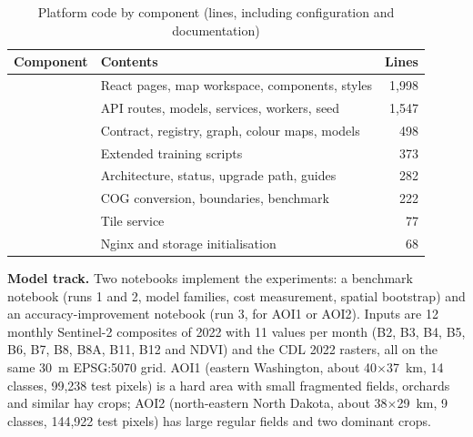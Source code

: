 \begin{table}[htbp]
\centering\small
\caption{Platform code by component (lines, including configuration and documentation)}
\label{tab:loc}
\begin{tabular}{L{4.0cm} L{6.6cm} r}
\toprule
\textbf{Component} & \textbf{Contents} & \textbf{Lines}\\
\midrule
{} & React pages, map workspace, components, styles & 1,998\\
 & API routes, models, services, workers, seed & 1,547\\
 & Contract, registry, graph, colour maps, models & 498\\
 & Extended training scripts & 373\\
 & Architecture, status, upgrade path, guides & 282\\
 & COG conversion, boundaries, benchmark & 222\\
 & Tile service & 77\\
 & Nginx and storage initialisation & 68\\
\bottomrule
\end{tabular}
\end{table}

\textbf{Model track.} Two notebooks implement the experiments: a benchmark notebook (runs 1 and 2,
model families, cost measurement, spatial bootstrap) and an accuracy-improvement notebook (run 3,
for AOI1 or AOI2). Inputs are 12 monthly Sentinel-2 composites of 2022 with 11 values per month
(B2, B3, B4, B5, B6, B7, B8, B8A, B11, B12 and NDVI) and the CDL 2022 rasters, all on the same 30~m
EPSG:5070 grid. AOI1 (eastern Washington, about 40$\times$37~km, 14 classes, 99,238 test pixels) is a
hard area with small fragmented fields, orchards and similar hay crops; AOI2 (north-eastern North
Dakota, about 38$\times$29~km, 9 classes, 144,922 test pixels) has large regular fields and two
dominant crops.

